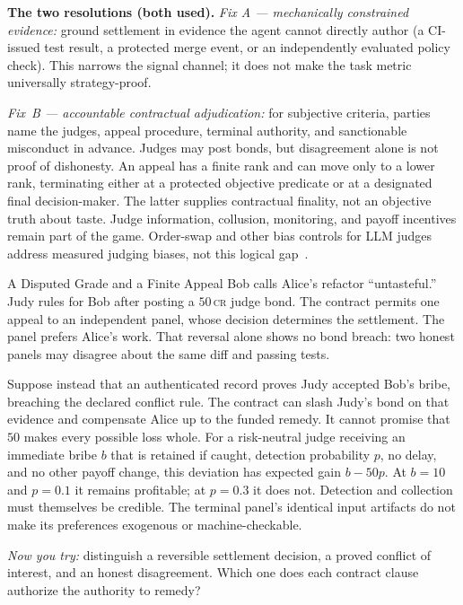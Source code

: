 \documentclass[11pt,a4paper]{article}
\theoremstyle{definition}
\theoremstyle{definition}
\theoremstyle{remark}
\begin{document}
\noindent\textbf{The two resolutions (both used).}
\emph{Fix A --- mechanically constrained evidence:} ground settlement in evidence
the agent cannot directly author (a CI-issued test result, a protected merge event,
or an independently evaluated policy check). This narrows the signal channel; it
does not make the task metric universally strategy-proof.

\noindent\emph{Fix~B --- accountable contractual adjudication:} for subjective
criteria, parties name the judges, appeal procedure, terminal authority, and
sanctionable misconduct in advance. Judges may post bonds, but disagreement
alone is not proof of dishonesty. An appeal has a finite rank and can move
only to a lower rank, terminating either at a protected objective predicate
or at a designated final decision-maker. The latter supplies contractual
finality, not an objective truth about taste. Judge information, collusion,
monitoring, and payoff incentives remain part of the game.
Order-swap and other bias controls for LLM judges address measured judging
biases, not this logical gap~.

\begin{pdexample}{A Disputed Grade and a Finite Appeal}
\setlength{\parskip}{4pt plus 1pt}
Bob calls Alice's refactor ``untasteful.'' Judy rules for Bob after posting
a $50$\,\textsc{cr} judge bond. The contract permits one appeal to an
independent panel, whose decision determines the settlement. The panel
prefers Alice's work. That reversal alone shows no bond breach: two honest
panels may disagree about the same diff and passing tests.

Suppose instead that an authenticated record proves Judy accepted Bob's
bribe, breaching the declared conflict rule. The contract can slash Judy's
bond on that evidence and compensate Alice up to the funded remedy.
It cannot promise that $50$ makes every possible loss whole.
For a risk-neutral judge receiving an immediate bribe $b$ that is retained
if caught, detection probability $p$, no delay, and no other payoff change,
this deviation has expected gain $b-50p$. At $b=10$ and $p=0.1$ it remains
profitable; at $p=0.3$ it does not. Detection and collection must themselves
be credible. The terminal panel's identical input artifacts do not make
its preferences exogenous or machine-checkable.

\emph{Now you try:} distinguish a reversible settlement decision, a proved
conflict of interest, and an honest disagreement. Which one does each
contract clause authorize the authority to remedy?
\end{pdexample}
\end{document}
